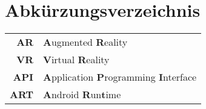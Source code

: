\chapter{Abkürzungsverzeichnis}

\begin{center}
\begin{tabular}{rl}
\textbf{AR} & \textbf{A}ugmented \textbf{R}eality \\ 
\textbf{VR} & \textbf{V}irtual \textbf{R}eality \\ 
\textbf{API} & \textbf{A}pplication \textbf{P}rogramming \textbf{I}nterface \\ 
\textbf{ART} & \textbf{A}ndroid \textbf{R}un\textbf{t}ime \\

\end{tabular}
\end{center}
 